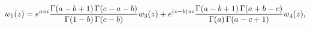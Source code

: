 \[w_{5}(z)=e^{a\pi i}\frac{\mathop{\Gamma\/}\nolimits\!\left(a-b+1\right)\mathop%
{\Gamma\/}\nolimits\!\left(c-a-b\right)}{\mathop{\Gamma\/}\nolimits\!\left(1-b%
\right)\mathop{\Gamma\/}\nolimits\!\left(c-b\right)}w_{3}(z)+e^{(c-b)\pi i}%
\frac{\mathop{\Gamma\/}\nolimits\!\left(a-b+1\right)\mathop{\Gamma\/}\nolimits%
\!\left(a+b-c\right)}{\mathop{\Gamma\/}\nolimits\!\left(a\right)\mathop{\Gamma%
\/}\nolimits\!\left(a-c+1\right)}w_{4}(z),\]